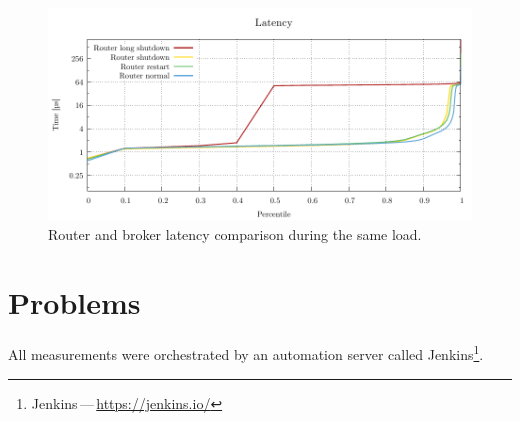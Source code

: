 \begin{figure}[H]
	\centering
	\includegraphics[width=1\linewidth]{obrazky-figures/charts-excel/agent_latency.pdf}
	\caption{Router and broker latency comparison during the same load.}
	\label{fig:agent_latency}
\end{figure}


\section{Problems}

All measurements were orchestrated by an automation server called Jenkins\footnote{Jenkins\,---\,\url{https://jenkins.io/}}.

